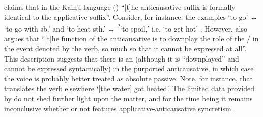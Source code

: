\citet[223]{mcgill:2009} claims that in the Kainji language  () “[t]he anticausative suffix  is formally identical to the applicative suffix”. Consider, for instance, the examples  ‘to go’ ↔  ‘to go with sb.’ and  ‘to heat sth.’ ↔  \textsuperscript{?}‘to spoil,’ i.e. ‘to get hot’ \citep[134, 142, 223f.]{mcgill:2009}. However, \citet[224]{mcgill:2009} also argues that “[t]he function of the anticausative is to downplay the role of the / in the event denoted by the verb, so much so that it cannot be expressed at all”. This description suggests that there is an  (although it is “downplayed” and cannot be expressed syntactically) in the purported anticausative, in which case the voice is probably better treated as absolute passive. Note, for instance, that \citeauthor{mcgill:2009} translates the verb  elsewhere ‘[the water] got heated’. The limited data provided by \citeauthor{mcgill:2009} do not shed further light upon the matter, and for the time being it remains inconclusive whether or not  features applicative-anticausative syncretism. 


